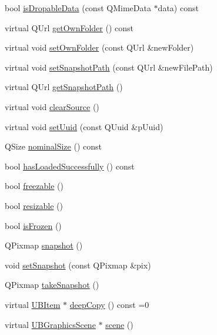 \begin{DoxyCompactItemize}
\item 
bool \hyperlink{class_u_b_graphics_widget_item_a4751f0ae2cbbb95a99e7bed93c795186}{is\-Dropable\-Data} (const Q\-Mime\-Data $\ast$data) const 
\item 
virtual Q\-Url \hyperlink{class_u_b_graphics_widget_item_ae72c192f0c682aa4f058d63e5f4be45e}{get\-Own\-Folder} () const 
\item 
virtual void \hyperlink{class_u_b_graphics_widget_item_ae550ec165d34b23bdfe2e26376b70943}{set\-Own\-Folder} (const Q\-Url \&new\-Folder)
\item 
virtual void \hyperlink{class_u_b_graphics_widget_item_a471d96294ca9427791318ebaf21e9318}{set\-Snapshot\-Path} (const Q\-Url \&new\-File\-Path)
\item 
virtual Q\-Url \hyperlink{class_u_b_graphics_widget_item_ac457785b52c6028625ac1f9bea2ec68c}{get\-Snapshot\-Path} ()
\item 
virtual void \hyperlink{class_u_b_graphics_widget_item_a708375d88c7886b6a3d67328859a7d92}{clear\-Source} ()
\item 
virtual void \hyperlink{class_u_b_graphics_widget_item_ad4cc767e9fb672aaaad3ce852249dd6e}{set\-Uuid} (const Q\-Uuid \&p\-Uuid)
\item 
Q\-Size \hyperlink{class_u_b_graphics_widget_item_a202b758dd1cf4021a44c0843539f2105}{nominal\-Size} () const 
\item 
bool \hyperlink{class_u_b_graphics_widget_item_ab32f32fe413e680030ab29527d57f483}{has\-Loaded\-Successfully} () const 
\item 
bool \hyperlink{class_u_b_graphics_widget_item_a18f6977517aec5fd49833af4def6f6a7}{freezable} ()
\item 
bool \hyperlink{class_u_b_graphics_widget_item_a884eb00607a8ba6ab96e444e203569c8}{resizable} ()
\item 
bool \hyperlink{class_u_b_graphics_widget_item_a10fbd95d94f4faf53781c51596e4ded7}{is\-Frozen} ()
\item 
Q\-Pixmap \hyperlink{class_u_b_graphics_widget_item_a1155a1b6429369e9e713780a94ad5ecd}{snapshot} ()
\item 
void \hyperlink{class_u_b_graphics_widget_item_a243c98e56f82a9daac96023e34c627fd}{set\-Snapshot} (const Q\-Pixmap \&pix)
\item 
Q\-Pixmap \hyperlink{class_u_b_graphics_widget_item_a3f2ad28f828946720871513620210585}{take\-Snapshot} ()
\item 
virtual \hyperlink{class_u_b_item}{U\-B\-Item} $\ast$ \hyperlink{class_u_b_graphics_widget_item_a9ba7781db36c5b1ed3f4db389d78d07e}{deep\-Copy} () const =0
\item 
virtual \hyperlink{class_u_b_graphics_scene}{U\-B\-Graphics\-Scene} $\ast$ \hyperlink{class_u_b_graphics_widget_item_ad7cad83001340bbfd1ec361a09f6a454}{scene} ()
\end{DoxyCompactItemize}

